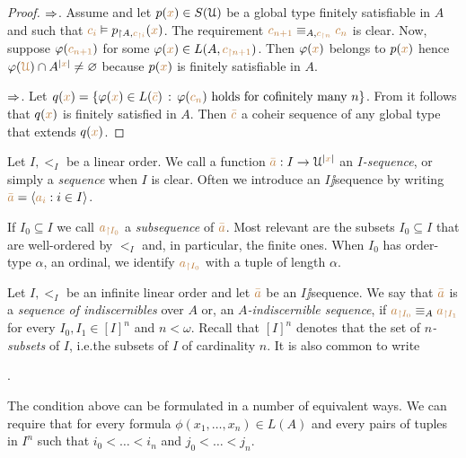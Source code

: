 \documentclass[creche.tex]{subfiles}
\begin{document}
\begin{proof}
$\Rightarrow$.
Assume  and let $p({\color{brown} x})\in S(\EuScript U)$ be a global type finitely satisfiable in $A$ and such that ${\color{brown} c_i}\vDash p_{\restriction A,{\color{brown} c_{\restriction i}}}({\color{brown} x})$.
The requirement ${\color{brown} c_{n+1}}\equiv_{A,{\color{brown} c_{\restriction n}}} {\color{brown} c_n}$ is clear.
Now, suppose $\varphi({\color{brown} c_{n+1}})$ for some $\varphi({\color{brown} x})\in L(A,{\color{brown} c_{\restriction n+1}})$.
Then $\varphi({\color{brown} x})$ belongs to $p({\color{brown} x})$ hence $\varphi({\color{brown}\EuScript U})\cap A^{|{\color{brown} x}|}\neq\varnothing$ because $p({\color{brown} x})$ is finitely satisfiable in $A$.

$\Rightarrow$.
Let $q({\color{brown} x})=\{\varphi({\color{brown} x})\in L({\color{brown}\bar c})\,:\, \varphi({\color{brown} c_n}) \textrm{ holds for cofinitely many } n\}$. From   it follows that $q({\color{brown} x})$ is finitely satisfied in $A$. Then ${\color{brown}\bar c}$ a coheir sequence of any global type that extends $q({\color{brown} x})$.
\end{proof}

Let $I,<_I$ be a linear order.
We call a function ${\color{brown}\bar a}:I\to\EuScript U^{|{\color{brown} x}|}$ an \emph{$I$-sequence}, or simply a \emph{sequence\/} when $I$ is clear.
Often we introduce an $I\jj$sequence by writing ${\color{brown}\bar a}=\langle{\color{brown}a_i}: i\in I\rangle$.

If $I_0\subseteq I$ we call ${\color{brown} a_{\restriction I_0}}$ a \emph{subsequence\/} of ${\color{brown}\bar a}$.
Most relevant are the subsets $I_0\subseteq I$ that are well-ordered by $<_I$ and, in particular, the finite ones.
When $I_0$ has order-type $\alpha$, an ordinal, we identify ${\color{brown} a_{\restriction I_0}}$ with a tuple of length $\alpha$.
 
\begin{definition}
Let $I,<_I$ be an infinite linear order and let ${\color{brown}\bar a}$ be an $I\jj$sequence.
We say that ${\color{brown}\bar a}$ is a \emph{sequence of indiscernibles\/} over $A$ or, an \emph{$A$-indiscernible sequence\/}, if ${\color{brown} a_{\restriction I_0}}\equiv_A {\color{brown} a_{\restriction I_1}}$ for every $I_0,I_1\in [I]^n$ and $n<\omega$.
Recall that \emph{$[I]^n$} denotes that the set of \emph{$n$-subsets\/} of $I$,  i.e.\@ the subsets of $I$ of cardinality $n$.
It is also common to write\smallskip

.\QED
\end{definition}

The condition above can be formulated in a number of equivalent ways.
We can require that for every formula $\phi(x_1,\dots,x_n)\in L(A)$ and every pairs of tuples in $I^n$ such that $i_0<\dots<i_n$ and $j_0<\dots<j_n$.
\end{document}
